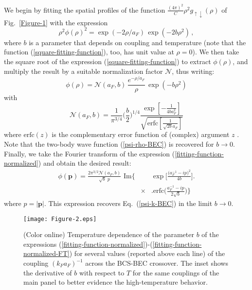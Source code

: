\documentclass[pra,twocolumn,aps,amssymb,showpacs,superscriptaddress]{revtex4-1}
\begin{document}
We begin by fitting the spatial profiles of the function $\frac{(4 \pi)^{2}}{C} \rho^{2}  g_{\uparrow \downarrow}(\rho)$ of Fig.~\ref{Figure-1} with the expression
\begin{equation}
\rho^{2} \phi(\rho)^{2} = \exp(-2 \rho/a_{F}) \, \exp(- 2 b \rho^{2}) \, ,
\label{square-fitting-function}
\end{equation}
where $b$ is a parameter that depends on coupling and temperature (note that the function (\ref{square-fitting-function}), too, has unit value at $\rho = 0$).
We then take the square root of the expression (\ref{square-fitting-function}) to extract $\phi(\rho)$, and multiply the result by a suitable normalization factor $\mathcal{N}$, thus writing:
\begin{equation}
\phi(\rho) = \mathcal{N}\!\left(a_{F},b \right) \, \frac{ e^{-\rho/a_{F}} }{ \rho } \, \exp(- b \rho^{2})
\label{fitting-function-normalized}
\end{equation}
with
\begin{equation}
\mathcal{N}\!\left(a_{F},b \right) = \frac{1}{\pi^{3/4}} \Big(\frac{b}{2}\Big)^{1/4} \frac{\exp [-\frac{1}{4ba_{F}^{2}}]} {\sqrt{\text{erfc}[ \frac{1}{\sqrt{2b} a_{F}} ]}} 
\end{equation}
where $\text{erfc}(z)$ is the complementary error function of (complex) argument $z$ \cite{AS-NBS-1972}.
Note that the two-body wave function (\ref{psi-rho-BEC}) is recovered for $b\to0$. 
Finally, we take the Fourier transform of the expression (\ref{fitting-function-normalized}) and obtain the desired result:
\begin{eqnarray}
\phi(\mathbf{p}) = \frac{2 \pi^{3/2} \mathcal{N}\!\left(a_{F},b \right)}{\sqrt{b} \,\, p} \,\, \text{Im} \bigg\{ && \!\!\!\!\!\!\! \exp \bigg[\frac{ \big(a_{F}^{-1} -i p \big)^2 }{4 b} \bigg]   \bigg.
\nonumber \\
& \times & \bigg. \text{erfc} \bigg( \frac{a_{F}^{-1} -i p}{2 \sqrt{b}} \bigg) \!\! \bigg\}
\label{fitting-function-normalized-FT}
\end{eqnarray}
where $p = |\mathbf{p}|$.
This expression recovers Eq.~(\ref{psi-k-BEC}) in the limit $b \rightarrow 0$.

\begin{figure}[t]
\begin{center}
\texttt{[image: Figure-2.eps]}
\caption{(Color online) Temperature dependence of the parameter $b$ of the expressions (\ref{fitting-function-normalized})-(\ref{fitting-function-normalized-FT}) 
                                     for several values (reported above each line) of the coupling $(k_{F}a_{F})^{-1}$ across the BCS-BEC crossover.
                                     The inset shows the derivative of $b$ with respect to $T$ for the same couplings of the main panel to better evidence the high-temperature behavior.}
\label{Figure-2}
\end{center}
\end{figure} 
\end{document}
